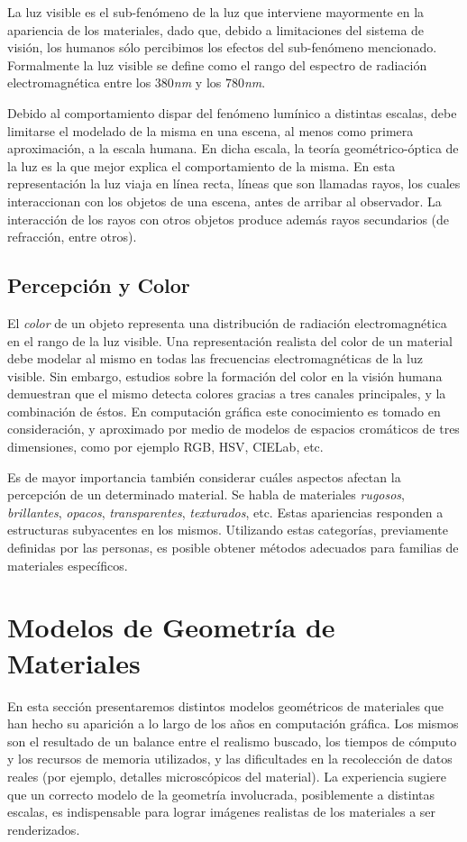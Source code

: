 La luz visible es el sub-fenómeno de la luz que interviene mayormente en la apariencia de los materiales, dado que, debido a limitaciones del sistema de visión, los humanos sólo percibimos los efectos del sub-fenómeno mencionado.
Formalmente la luz visible se define como el rango del espectro de radiación electromagnética entre los  $380${\em nm} y los $780${\em nm}.

Debido al comportamiento dispar del fenómeno lumínico a distintas escalas, debe limitarse el modelado de la misma en una escena, al menos como primera aproximación, a la escala humana.
En dicha escala, la teoría geométrico-óptica de la luz es la que mejor explica el comportamiento de la misma.
En esta representación la luz viaja en línea recta, líneas que son llamadas rayos, los cuales interaccionan con los objetos de una escena, antes de arribar al observador.
La interacción de los rayos con otros objetos produce además rayos secundarios (de refracción, entre otros).

\subsection{Percepción y Color}
El {\em color} de un objeto representa una distribución de radiación electromagnética en el rango de la luz visible.
Una representación realista del color de un material debe modelar al mismo en todas las frecuencias electromagnéticas de la luz visible.
Sin embargo, estudios sobre la formación del color en la visión humana demuestran que el mismo detecta colores gracias a tres canales principales, y la combinación de éstos.
En computación gráfica este conocimiento es tomado en consideración, y aproximado por medio de modelos de espacios cromáticos de tres dimensiones, como por ejemplo \acrshort{RGB}, \acrshort{HSV}, CIELab, etc.

Es de mayor importancia también considerar cuáles aspectos afectan la percepción de un determinado material.
Se habla de materiales {\em rugosos}, {\em brillantes}, {\em opacos}, {\em transparentes}, {\em texturados}, etc.
Estas apariencias responden a estructuras subyacentes en los mismos.
Utilizando estas categorías, previamente definidas por las personas, es posible obtener métodos adecuados para familias de materiales específicos.

\section{Modelos de Geometría de Materiales}
En esta sección presentaremos distintos modelos geométricos de materiales que han hecho su aparición a lo largo de los años en computación gráfica.
Los mismos son el resultado de un balance entre el realismo buscado, los tiempos de cómputo y los recursos de memoria utilizados, y las dificultades en la recolección de datos reales (por ejemplo, detalles microscópicos del material).
La experiencia sugiere que un correcto modelo de la geometría involucrada, posiblemente a distintas escalas, es indispensable para lograr imágenes realistas de los materiales a ser renderizados.

